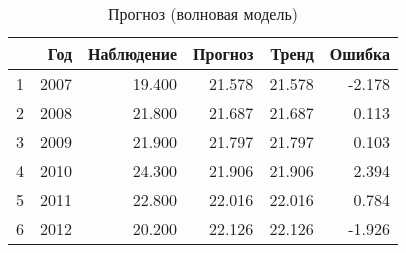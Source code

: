 \begin{table}[ht]
\centering
\begin{tabular}{rrrrrr}
  \hline
 & Год & Наблюдение & Прогноз & Тренд & Ошибка \\ 
  \hline
1 & 2007 & 19.400 & 21.578 & 21.578 & -2.178 \\ 
  2 & 2008 & 21.800 & 21.687 & 21.687 & 0.113 \\ 
  3 & 2009 & 21.900 & 21.797 & 21.797 & 0.103 \\ 
  4 & 2010 & 24.300 & 21.906 & 21.906 & 2.394 \\ 
  5 & 2011 & 22.800 & 22.016 & 22.016 & 0.784 \\ 
  6 & 2012 & 20.200 & 22.126 & 22.126 & -1.926 \\ 
   \hline
\end{tabular}
\caption{Прогноз (волновая модель)} 
\label{table:auto-rob-20-prediction}
\end{table}
